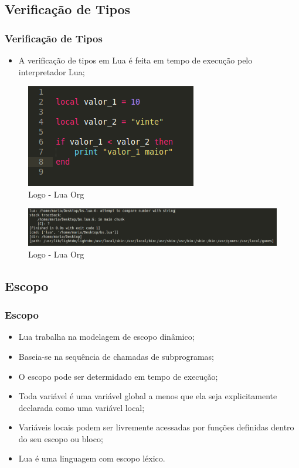 ﻿\documentclass{beamer}
\begin{document}
\subsection{Verificação de Tipos}
\begin{frame}[fragile]
\frametitle{Verificação de Tipos}
\begin{itemize}
\item A verificação de tipos em Lua é feita em tempo de execução pelo interpretador Lua;
\end{itemize}
\begin{figure}[!htb]
\centering
\includegraphics[width=0.3\linewidth]{imagens/verificacao_tipo2}
\caption{Logo - Lua Org}
\end{figure}

\begin{figure}[!htb]
\centering
\includegraphics[width=1\linewidth]{imagens/verificacao_tipo}
\caption{Logo - Lua Org}
\end{figure}
\end{frame}

\subsection{Escopo}
\begin{frame}[fragile]
\frametitle{Escopo}
\begin{itemize}
\item<1-> Lua trabalha na modelagem de escopo dinâmico;
\item<2-> Baseia-se na sequência de chamadas de subprogramas;
\item<3-> O escopo pode ser determidado em tempo de execução;
\item<4-> Toda variável é uma variável global a menos que ela seja explicitamente declarada como uma variável local;
\item<5-> Variáveis locais podem ser livremente acessadas por funções definidas dentro do seu escopo ou bloco;
\item<6-> Lua é uma linguagem com escopo léxico.
\end{itemize}
\end{frame}
\end{document}
